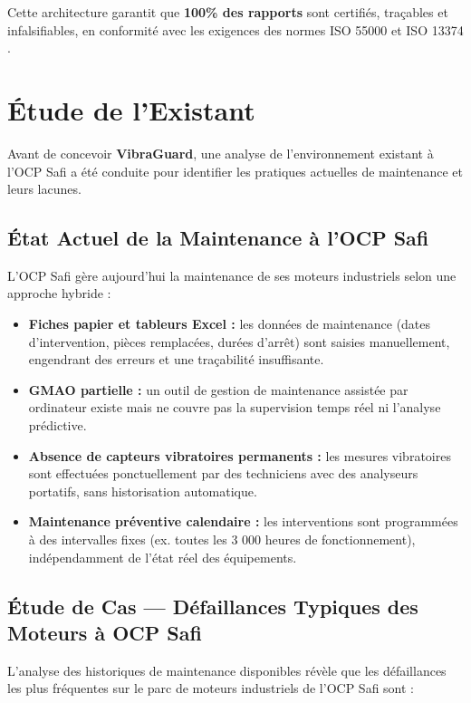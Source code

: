 \documentclass[12pt, a4paper, oneside]{report}
\newcommand{\projectname}{\textbf{VibraGuard}}
\begin{document}
Cette architecture garantit que \textbf{100\% des rapports} sont certifiés,
traçables et infalsifiables, en conformité avec les exigences des normes ISO 55000
\cite{iso55000} et ISO 13374 \cite{iso13374}.

\section{Étude de l'Existant}

Avant de concevoir \projectname{}, une analyse de l'environnement existant à l'OCP Safi a été
conduite pour identifier les pratiques actuelles de maintenance et leurs lacunes.

\subsection{État Actuel de la Maintenance à l'OCP Safi}

L'OCP Safi gère aujourd'hui la maintenance de ses moteurs industriels selon une approche
hybride :

\begin{itemize}
  \item \textbf{Fiches papier et tableurs Excel :} les données de maintenance (dates d'intervention,
  pièces remplacées, durées d'arrêt) sont saisies manuellement, engendrant des erreurs et une
  traçabilité insuffisante.
  \item \textbf{GMAO partielle :} un outil de gestion de maintenance assistée par ordinateur
  existe mais ne couvre pas la supervision temps réel ni l'analyse prédictive.
  \item \textbf{Absence de capteurs vibratoires permanents :} les mesures vibratoires sont
  effectuées ponctuellement par des techniciens avec des analyseurs portatifs, sans historisation
  automatique.
  \item \textbf{Maintenance préventive calendaire :} les interventions sont programmées à des
  intervalles fixes (ex. toutes les 3 000 heures de fonctionnement), indépendamment de l'état
  réel des équipements.
\end{itemize}

\subsection{Étude de Cas — Défaillances Typiques des Moteurs à OCP Safi}

L'analyse des historiques de maintenance disponibles révèle que les défaillances les plus
fréquentes sur le parc de moteurs industriels de l'OCP Safi sont :
\end{document}
